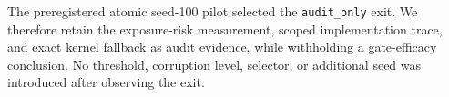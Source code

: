 The preregistered atomic seed-100 pilot selected the
\texttt{audit\_only} exit. We therefore retain the exposure-risk
measurement, scoped implementation trace, and exact kernel fallback as
audit evidence, while withholding a gate-efficacy conclusion. No
threshold, corruption level, selector, or additional seed was introduced
after observing the exit.
